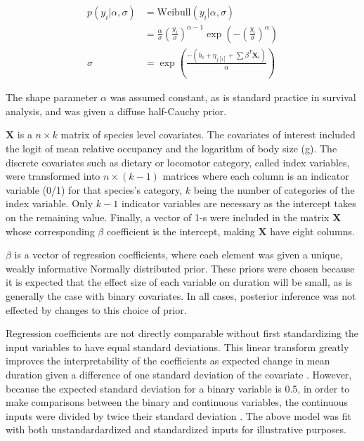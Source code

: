 \documentclass[12pt,letterpaper]{article}
\begin{document}
\begin{align}
  p(y_{i}|\alpha, \sigma) &= \mathrm{Weibull}(y_{i}|\alpha, \sigma) \nonumber \\ 
  &= \frac{\alpha}{\sigma} \left(\frac{y_{i}}{\sigma}\right)^{\alpha - 1} \exp\left(-\left(\frac{y_{i}}{\sigma}\right)^{\alpha}\right) \label{eq:weibull}\\
  \sigma &= \exp\left(\frac{-(h_{i} + \eta_{j[i]} + \sum \beta^{T} \mathbf{X}_{i})}{\alpha}\right) \label{eq:reg}
\end{align}

The shape parameter \(\alpha\) was assumed constant, as is standard practice in survival analysis, and was given a diffuse half-Cauchy prior. 

\(\mathbf{X}\) is a \(n \times k\) matrix of species level covariates. The covariates of interest included the logit of mean relative occupancy and the logarithm of body size (g). The discrete covariates such as dietary or locomotor category, called index variables, were transformed into \(n \times (k - 1)\) matrices where each column is an indicator variable (0/1) for that species's category, \(k\) being the number of categories of the index variable. Only \(k - 1\) indicator variables are necessary as the intercept takes on the remaining value. Finally, a vector of 1-s were included in the matrix \(\mathbf{X}\) whose corresponding \(\beta\) coefficient is the intercept, making \(\mathbf{X}\) have eight columns.

\(\beta\) is a vector of regression coefficients, where each element was given a unique, weakly informative Normally distributed prior. These priors were chosen because it is expected that the effect size of each variable on duration will be small, as is generally the case with binary covariates. In all cases, posterior inference was not effected by changes to this choice of prior. %

Regression coefficients are not directly comparable without first standardizing the input variables to have equal standard deviations. This linear transform greatly improves the interpretability of the coefficients as expected change in mean duration given a difference of one standard deviation of the covariate \citep{Schielzeth2010}. However, because the expected standard deviation for a binary variable is 0.5, in order to make comparisons between the binary and continuous variables, the continuous inputs were divided by twice their standard deviation \citep{Gelman2008}. The above model was fit with both unstandardardized and standardized inputs for illustrative purposes.
\end{document}
